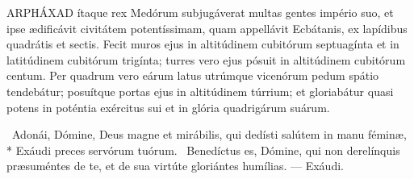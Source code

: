 




\lettrine[lines=2]{A}{RPHÁXAD} ítaque rex Medórum subjugáverat multas gentes império suo, et ipse ædificávit civitátem potentíssimam, quam appellávit Ecbátanis, ex lapídibus quadrátis et sectis. Fecit muros ejus in altitúdinem cubitórum septuagínta et in latitúdinem cubitórum trigínta; turres vero ejus pósuit in altitúdinem cubitórum centum. Per quadrum vero eárum latus utrúmque vicenórum pedum spátio tendebátur; posuítque portas ejus in altitúdinem túrrium; et gloriabátur quasi potens in poténtia exércitus sui et in glória quadrigárum suárum.

\R\ Adonái, Dómine, Deus magne et mirábilis, qui dedísti salútem in manu féminæ, * Exáudi preces servórum tuórum. \V\ Benedíctus es, Dómine, qui non derelínquis præsuméntes de te, et de sua virtúte gloriántes humílias. — Exáudi.


